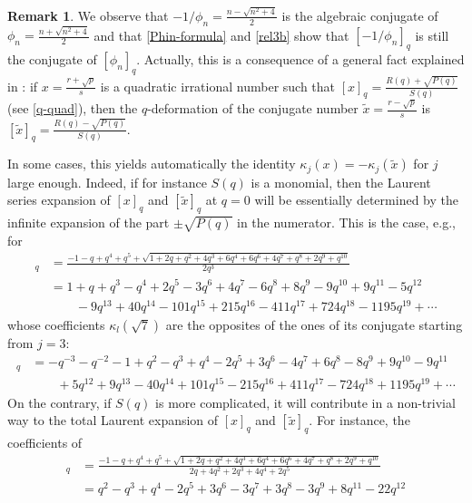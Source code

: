 \documentclass[11pt,reqno]{amsart}
\theoremstyle{plain}
\theoremstyle{definition}
\newtheorem{remarque}[lemme]{Remark}
\numberwithin{figure}{section}
\numberwithin{table}{section}
\numberwithin{equation}{section}
\newcommand\ka{\kappa}
\let\fr=\frac
\begin{document}
\begin{remarque}
We observe that $-1/\phi_n=\fr{n-\sqrt{n^2+4}}2$ is the algebraic conjugate of $\phi_n=\fr{n+\sqrt{n^2+4}}2$ and that \eqref{Phin-formula} and \eqref{rel3b} show that $[-1/\phi_n]_q$ is still the conjugate of $[\phi_n]_q$. Actually, this is a consequence of a general fact explained in \cite{LMG21}: if $x=\fr{r+\sqrt{p}}{s}$ is a quadratic irrational  number such that $[x]_q=\fr{R(q)+ \sqrt{P(q)}}{S(q)}$ (see \eqref{q-quad}), then  the $q$-deformation of the conjugate number $\tilde x=\fr{r-\sqrt{p}}{s}$ is
$[\tilde x]_q=\fr{R(q)- \sqrt{P(q)}}{S(q)}$.

In some cases, this yields automatically the identity $\ka_j(x)=-\ka_j(\tilde x)$ for $j$ large enough. Indeed, if for instance $S(q)$ is a monomial, then the Laurent series expansion of $[x]_q$ and $[\tilde x]_q$ at $q=0$ will be essentially determined by the infinite expansion of the part $\pm\sqrt{P(q)}$ in the numerator. This is the case, e.g., for
\begin{align*}
[\sqrt{7}]_q&=\fr{-1-q+q^4 + q^5+\sqrt{1 + 2 q +  q^{2} + 4 q^{3} + 6 q^{4} + 6 q^{6} + 4 q^{7} +  q^{8} + 2 q^{9} +  q^{10}}}{2q^3}\\
&= 1 + q + q^{3} - q^{4} + 2q^{5} - 3q^{6} + 4q^{7} - 6q^{8} + 8q^{9} - 9q^{10} + 9q^{11} - 5q^{12} \\
&\qquad - 9q^{13} + 40q^{14} - 101q^{15} + 215q^{16} - 411q^{17} + 724q^{18} - 1195q^{19} + \cdots
\end{align*} 
whose coefficients $\ka_l(\sqrt{7})$ are the opposites of the ones of its conjugate starting from $j=3$:
\begin{align*}
[-\sqrt{7}]_q&= - q^{-3} -q^{-2} - 1 + q^{2} -  q^{3} +  q^{4} - 2 q^{5} + 3 q^{6} - 4 q^{7} + 6 q^{8} - 8 q^{9} + 9 q^{10} - 9 q^{11}  \\
&\qquad + 5 q^{12} + 9 q^{13} - 40 q^{14} + 101 q^{15} - 215 q^{16} + 411 q^{17} - 724 q^{18} + 1195 q^{19}  +\cdots
\end{align*}
On the contrary, if $S(q)$ is more complicated, it will contribute in a non-trivial way to the total Laurent expansion of $[x]_q$ and $[\tilde x]_q$.
For instance, the coefficients of 
\begin{align*}
[1/\sqrt{7}]_q&=\fr{-1-q+q^4 + q^5+\sqrt{1 + 2 q +  q^{2} + 4 q^{3} + 6 q^{4} + 6 q^{6} + 4 q^{7} +  q^{8} + 2 q^{9} +  q^{10}}}{ 2q + 4q^2 + 2q^3 + 4q^4 + 2q^5}\\
&=q^2 -q^3 + q^4 -2q^5 + 3q^6 -3q^7 + 3q^8 -3q^9 + 8q^{11} -22q^{12}\\

\end{align*}
\end{remarque}
\end{document}
